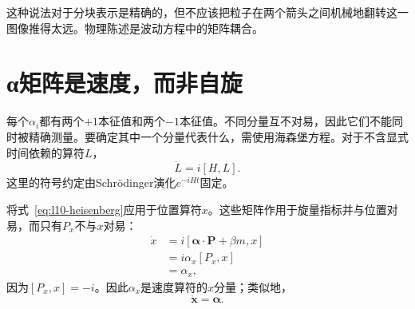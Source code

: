 \begin{classroomqa}
\end{classroomqa}

这种说法对于分块表示是精确的，但不应该把粒子在两个箭头之间机械地翻转这一图像推得太远。物理陈述是波动方程中的矩阵耦合。

\begin{classroomqa}
\end{classroomqa}

\begin{classroomqa}
\end{classroomqa}

\section{{\proseunicodefont α}矩阵是速度，而非自旋}

每个\(\alpha_i\)都有两个\(+1\)本征值和两个\(-1\)本征值。不同分量互不对易，因此它们不能同时被精确测量。要确定其中一个分量代表什么，需使用海森堡方程。对于不含显式时间依赖的算符\(L\)，
\begin{equation}
\dot L=i[H,L].
\label{eq:l10-heisenberg}
\end{equation}
这里的符号约定由Schr\"odinger演化\(e^{-iHt}\)固定。

将式~\eqref{eq:l10-heisenberg}应用于位置算符\(x\)。这些矩阵作用于旋量指标并与位置对易，而只有\(P_x\)不与\(x\)对易：
\begin{align}
\dot x
&=i[\boldsymbol{\alpha}\cdot\mathbf P+\beta m,x]\\
&=i\alpha_x[P_x,x]\\
&=\alpha_x,
\label{eq:l10-velocity}
\end{align}
因为\([P_x,x]=-i\)。因此\(\alpha_x\)是速度算符的\(x\)分量；类似地，
\begin{equation}
\dot{\mathbf x}=\boldsymbol{\alpha}.
\end{equation}

